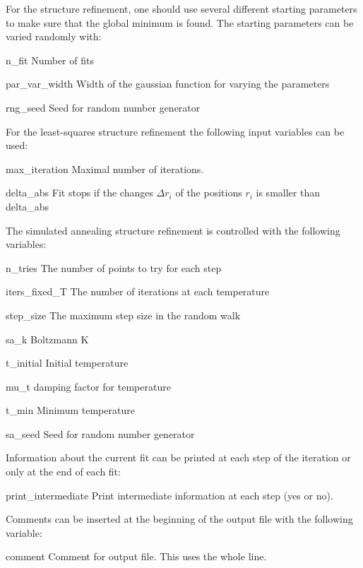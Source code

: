 \documentclass[a4paper]{article}
\begin{document}
For the structure refinement, one should use several different
starting parameters to make sure that the global minimum is found. The
starting parameters can be varied randomly with:
\begin{vardef}
\item[n\_fit] Number of fits
\item[par\_var\_width] Width of the gaussian function for varying the
parameters 
\item[rng\_seed] Seed for random number generator
\end{vardef}
For the least-squares structure refinement the following input
variables can be used: 
\begin{vardef}
\item[max\_iteration] Maximal number of iterations.
\item[delta\_abs] Fit stops if the changes $\Delta r_i$
 of the positions $r_i$ is smaller than delta\_abs 
\end{vardef}
The simulated annealing structure refinement is controlled with the
following variables:
\begin{vardef}
\item[n\_tries] The number of points to try for each step 
\item[iters\_fixed\_T] The number of iterations at each temperature
\item[step\_size] The maximum step size in the random walk
\item[sa\_k] Boltzmann K 
\item[t\_initial] Initial temperature
\item[mu\_t] damping factor for temperature
\item[t\_min] Minimum temperature
\item[sa\_seed] Seed for random number generator
\end{vardef}
Information about the current fit can be printed at each step of the
iteration or  only at the end of each fit:
\begin{vardef}
\item[print\_intermediate] Print intermediate information at each step
(yes or no).
\end{vardef}

Comments can be inserted at the beginning of the output file with the
following variable:
\begin{vardef}
\item[comment] Comment for output file. This uses the whole line.
\end{vardef}
\end{document}
